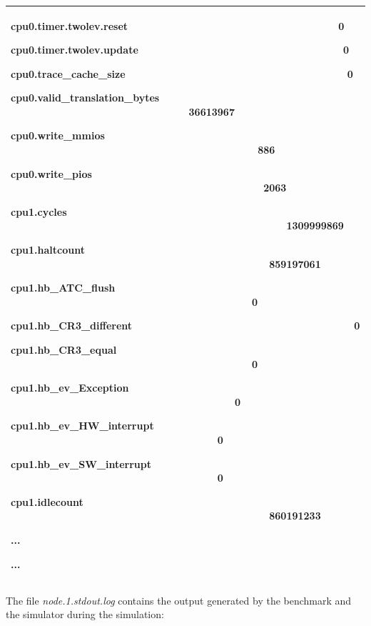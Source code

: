\documentclass[a4paper]{article}
\begin{document}
\begin{flushleft}
\begin{tiny}
\begin{supertabular}{|m{6.34626in}|}
{\ttfamily cpu0.timer.twolev.reset
\ \ \ \ \ \ \ \ \ \ \ \ \ \ \ \ \ \ \ \ \ \ \ \ \ \ \ \ \ \ \ \ \ \ \ \ 0}

{\ttfamily cpu0.timer.twolev.update
\ \ \ \ \ \ \ \ \ \ \ \ \ \ \ \ \ \ \ \ \ \ \ \ \ \ \ \ \ \ \ \ \ \ \ 0}

{\ttfamily cpu0.trace\_cache\_size
\ \ \ \ \ \ \ \ \ \ \ \ \ \ \ \ \ \ \ \ \ \ \ \ \ \ \ \ \ \ \ \ \ \ \ \ \ \ 0}

{\ttfamily cpu0.valid\_translation\_bytes
\ \ \ \ \ \ \ \ \ \ \ \ \ \ \ \ \ \ \ \ \ \ \ \ \ \ \ \ \ \ \ 36613967}

{\ttfamily cpu0.write\_mmios
\ \ \ \ \ \ \ \ \ \ \ \ \ \ \ \ \ \ \ \ \ \ \ \ \ \ \ \ \ \ \ \ \ \ \ \ \ \ \ \ \ \ \ 886}

{\ttfamily cpu0.write\_pios
\ \ \ \ \ \ \ \ \ \ \ \ \ \ \ \ \ \ \ \ \ \ \ \ \ \ \ \ \ \ \ \ \ \ \ \ \ \ \ \ \ \ \ \ 2063}

{\ttfamily cpu1.cycles
\ \ \ \ \ \ \ \ \ \ \ \ \ \ \ \ \ \ \ \ \ \ \ \ \ \ \ \ \ \ \ \ \ \ \ \ \ \ \ \ \ \ \ \ \ \ \ \ 1309999869}

{\ttfamily cpu1.haltcount
\ \ \ \ \ \ \ \ \ \ \ \ \ \ \ \ \ \ \ \ \ \ \ \ \ \ \ \ \ \ \ \ \ \ \ \ \ \ \ \ \ \ \ \ \ 859197061}

{\ttfamily cpu1.hb\_ATC\_flush
\ \ \ \ \ \ \ \ \ \ \ \ \ \ \ \ \ \ \ \ \ \ \ \ \ \ \ \ \ \ \ \ \ \ \ \ \ \ \ \ \ \ 0}

{\ttfamily cpu1.hb\_CR3\_different
\ \ \ \ \ \ \ \ \ \ \ \ \ \ \ \ \ \ \ \ \ \ \ \ \ \ \ \ \ \ \ \ \ \ \ \ \ \ 0}

{\ttfamily cpu1.hb\_CR3\_equal
\ \ \ \ \ \ \ \ \ \ \ \ \ \ \ \ \ \ \ \ \ \ \ \ \ \ \ \ \ \ \ \ \ \ \ \ \ \ \ \ \ \ 0}

{\ttfamily cpu1.hb\_ev\_Exception
\ \ \ \ \ \ \ \ \ \ \ \ \ \ \ \ \ \ \ \ \ \ \ \ \ \ \ \ \ \ \ \ \ \ \ \ \ \ \ 0}

{\ttfamily cpu1.hb\_ev\_HW\_interrupt
\ \ \ \ \ \ \ \ \ \ \ \ \ \ \ \ \ \ \ \ \ \ \ \ \ \ \ \ \ \ \ \ \ \ \ \ 0}

{\ttfamily cpu1.hb\_ev\_SW\_interrupt
\ \ \ \ \ \ \ \ \ \ \ \ \ \ \ \ \ \ \ \ \ \ \ \ \ \ \ \ \ \ \ \ \ \ \ \ 0}

{\ttfamily cpu1.idlecount
\ \ \ \ \ \ \ \ \ \ \ \ \ \ \ \ \ \ \ \ \ \ \ \ \ \ \ \ \ \ \ \ \ \ \ \ \ \ \ \ \ \ \ \ \ 860191233}

{\ttfamily ...}

\ttfamily ...\\\hline
\end{supertabular}
\end{tiny}
\end{flushleft}
{
The file \textit{node.1.stdout.log }contains the output generated by the
benchmark and the simulator during the simulation:}
\end{document}
